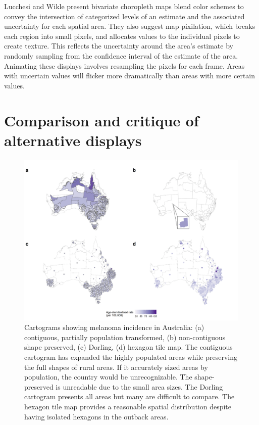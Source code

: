 \documentclass{monashthesis}
\begin{document}
Lucchesi and Wikle \autocite{VUADBC} present bivariate choropleth maps blend color schemes to convey the intersection of categorized levels of an estimate and the associated uncertainty for each spatial area. They also suggest map pixilation, which breaks each region into small pixels, and allocates values to the individual pixels to create texture. This reflects the uncertainty around the area's estimate by randomly sampling from the confidence interval of the estimate of the area. Animating these displays involves resampling the pixels for each frame. Areas with uncertain values will flicker more dramatically than areas with more certain values.

\hypertarget{comparison-and-critique-of-alternative-displays}{%
\section{Comparison and critique of alternative displays}\label{comparison-and-critique-of-alternative-displays}}

\begin{figure}

{\centering \includegraphics[width=1\linewidth]{figures/02-literature/auscartograms} 

}

\caption{ Cartograms showing melanoma incidence in Australia: (a) contiguous, partially population transformed, (b) non-contiguous shape preserved, (c) Dorling, (d) hexagon tile map. The contiguous cartogram has expanded the highly populated areas while preserving the full shapes of rural areas. If it accurately sized areas by population, the country would be unrecognizable. The shape-preserved is unreadable due to the small area sizes. The Dorling cartogram presents all areas but many are difficult to compare. The hexagon tile map provides a reasonable spatial distribution despite having isolated hexagons in the outback areas.}\label{fig:auscartograms}
\end{figure}
\end{document}
